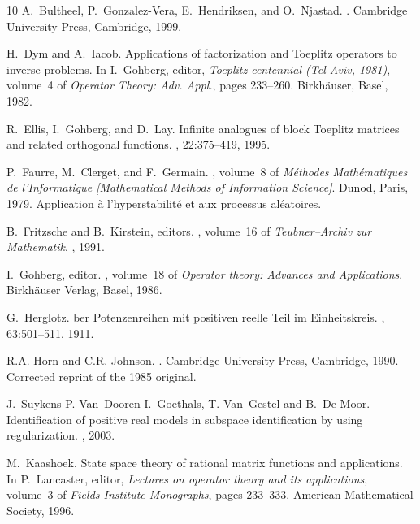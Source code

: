 \documentclass[12pt]{amsart}
\theoremstyle{definition}
\theoremstyle{remark}
\numberwithin{equation}{section}
\begin{document}
\begin{thebibliography}{10}
A.~Bultheel, P.~Gonzalez-Vera, E.~Hendriksen, and O.~Njastad.
.
\newblock Cambridge University Press, Cambridge, 1999.

H.~Dym and A.~Iacob.
\newblock Applications of factorization and {T}oeplitz operators to inverse
  problems.
\newblock In I.~Gohberg, editor, {\em Toeplitz centennial (Tel Aviv, 1981)},
  volume~4 of {\em Operator Theory: Adv. Appl.}, pages 233--260. Birkh\"auser,
  Basel, 1982.

R.~Ellis, I.~Gohberg, and D.~Lay.
\newblock Infinite analogues of block {T}oeplitz matrices and related
  orthogonal functions.
, 22:375--419, 1995.

P.~Faurre, M.~Clerget, and F.~Germain.
, volume~8 of {\em M\'ethodes
  Math\'ematiques de l'Informatique [Mathematical Methods of Information
  Science]}.
\newblock Dunod, Paris, 1979.
\newblock Application \`a l'hyperstabilit\'e et aux processus al\'eatoires.

B.~Fritzsche and B.~Kirstein, editors.
, volume~16 of {\em {Teubner--Archiv zur Mathematik}}.
, 1991.

I.~Gohberg, editor.
,
  volume~18 of {\em Operator theory: {A}dvances and {A}pplications}.
\newblock Birkh{\" a}user Verlag, Basel, 1986.

G.~Herglotz.
ber {P}otenzenreihen mit positiven reelle {T}eil im
  {E}inheitskreis.
,
  63:501--511, 1911.

R.A. Horn and C.R. Johnson.
.
\newblock Cambridge University Press, Cambridge, 1990.
\newblock Corrected reprint of the 1985 original.

J.~Suykens P. Van~Dooren I.~Goethals, T. Van~Gestel and B.~De Moor.
\newblock Identification of positive real models in subspace identification by
  using regularization.
, 2003.

M.~Kaashoek.
\newblock State space theory of rational matrix functions and applications.
\newblock In P.~Lancaster, editor, {\em Lectures on operator theory and its
  applications}, volume~3 of {\em Fields {I}nstitute {M}onographs}, pages
  233--333. American {M}athematical {S}ociety, 1996.


\end{thebibliography}
\end{document}
